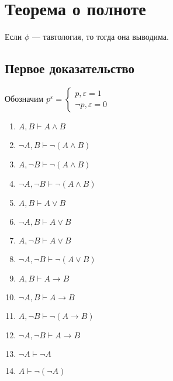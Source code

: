 
\section{Теорема о полноте}

\begin{theorem}[О полноте]
    Если $\phi$ --- тавтология, то тогда она выводима.
\end{theorem}

\subsection{Первое доказательство}


\begin{definition}
    Обозначим $p^\varepsilon = \left\{\begin{array}{l}
        p, \varepsilon = 1  \\
        \neg p, \varepsilon = 0
    \end{array}\right.$
\end{definition}

\begin{lemma}\indent
\begin{enumerate}
    \item $A, B \vdash A \wedge B$
    \item $\neg A, B \vdash \neg(A \wedge B)$
    \item $A, \neg B \vdash \neg(A \wedge B)$
    \item $\neg A, \neg B \vdash \neg(A \wedge B)$
    \item $A, B \vdash A \vee B$
    \item $\neg A, B \vdash A \vee B$
    \item $A, \neg B \vdash A \vee B$
    \item $\neg A, \neg B \vdash \neg(A \vee B)$
    \item $A, B \vdash A \rightarrow B$
    \item $\neg A, B \vdash A \rightarrow B$
    \item $A, \neg B \vdash \neg(A \rightarrow B)$
    \item $\neg A, \neg B \vdash A \rightarrow B$
    \item $\neg A \vdash \neg A$
    \item $A \vdash \neg (\neg A)$
\end{enumerate}
\end{lemma}

